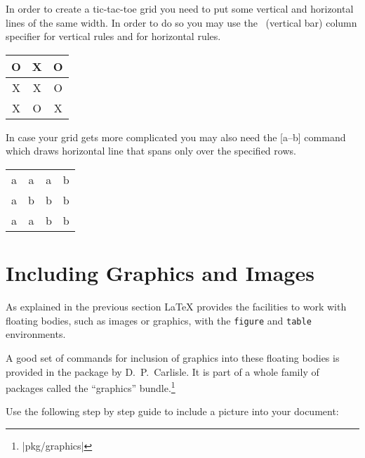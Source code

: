 In order to create a tic-tac-toe grid you need to put some vertical and
horizontal lines of the same width. In order to do so you may use the
\cargv{|}~(vertical bar) column specifier for vertical rules and  for
horizontal rules.
\begin{example}
\begin{tabular}{c|c|c}
  O & X & O \\
  \hline
  X & X & O \\
  \hline
  X & O & X \\
\end{tabular}
\end{example} 
In case your grid gets more complicated you may also need the [a--b]
command which draws horizontal line that spans only over the specified rows.
\begin{example}[examplewidth=0.4\linewidth]
\begin{tabular}{|cccc|}
  \cline{4-4}
  a & a & \multicolumn{1}{c|}{a} & b \\
  \cline{2-3}
  a & \multicolumn{1}{|c}{b} & b & b \\
  \cline{2-2}
  a & a & \multicolumn{1}{|c}{b} & b \\
  \cline{1-2}
\end{tabular}
\end{example} 

\section{Including Graphics and Images}\label{eps}

As explained in the previous section \LaTeX{} provides the facilities to work with floating bodies,
such as images or graphics, with the \texttt{figure} and
\texttt{table} environments.

A good set of commands for inclusion of graphics into these floating bodies is provided in the
 package by D.~P.~Carlisle. It is part of a whole family
of packages called the ``graphics''
bundle.\footnote{\CTAN|pkg/graphics|}

Use the following step by step guide to
include a picture into your document:

